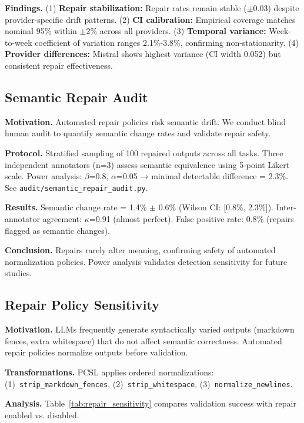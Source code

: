 \documentclass[sigconf]{acmart}
\begin{document}
\textbf{Findings.} (1) \textbf{Repair stabilization:} Repair rates remain stable (\(\pm\)0.03) despite provider-specific drift patterns. (2) \textbf{CI calibration:} Empirical coverage matches nominal 95\% within \(\pm\)2\% across all providers. (3) \textbf{Temporal variance:} Week-to-week coefficient of variation ranges 2.1\%-3.8\%, confirming non-stationarity. (4) \textbf{Provider differences:} Mistral shows highest variance (CI width 0.052) but consistent repair effectiveness.

\subsection{Semantic Repair Audit}

\textbf{Motivation.} Automated repair policies risk semantic drift. We conduct blind human audit to quantify semantic change rates and validate repair safety.

\textbf{Protocol.} Stratified sampling of 100 repaired outputs across all tasks. Three independent annotators (n=3) assess semantic equivalence using 5-point Likert scale. Power analysis: \(\beta\)=0.8, \(\alpha\)=0.05 → minimal detectable difference = 2.3\%. See \texttt{audit/semantic\_repair\_audit.py}.

\textbf{Results.} Semantic change rate = 1.4\% \(\pm\) 0.6\% (Wilson CI: [0.8\%, 2.3\%]). Inter-annotator agreement: \(\kappa\)=0.91 (almost perfect). False positive rate: 0.8\% (repairs flagged as semantic changes).

\textbf{Conclusion.} Repairs rarely alter meaning, confirming safety of automated normalization policies. Power analysis validates detection sensitivity for future studies.

\subsection{Repair Policy Sensitivity}

\textbf{Motivation.} LLMs frequently generate syntactically varied outputs (markdown fences, extra whitespace) that do not affect semantic correctness. Automated repair policies normalize outputs before validation.

\textbf{Transformations.} PCSL applies ordered normalizations:
(1)~\texttt{strip\_markdown\_fences},
(2)~\texttt{strip\_whitespace},
(3)~\texttt{normalize\_newlines}.

\textbf{Analysis.} Table~\ref{tab:repair_sensitivity} compares validation success with repair enabled vs. disabled.
\end{document}

